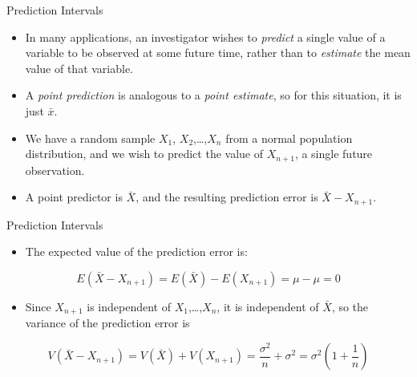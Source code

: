 \documentclass[
  ignorenonframetext,
]{beamer}
\providecommand{\tightlist}{%
  \setlength{\itemsep}{0pt}\setlength{\parskip}{0pt}}\usepackage{longtable,booktabs,array}
\begin{document}
\begin{frame}{Prediction Intervals}
\protect\hypertarget{prediction-intervals}{}
\begin{itemize}[<+->]
\tightlist
\item
  In many applications, an investigator wishes to \emph{predict} a
  single value of a variable to be observed at some future time, rather
  than to \emph{estimate} the mean value of that variable.
\item
  A \emph{point prediction} is analogous to a \emph{point estimate}, so
  for this situation, it is just \(\bar{x}\).
\item
  We have a random sample \(X_{1}\), \(X_{2}\),\ldots,\(X_{n}\) from a
  normal population distribution, and we wish to predict the value of
  \(X_{n+1}\), a single future observation.
\item
  A point predictor is \(\bar{X}\), and the resulting prediction error
  is \(\bar{X} - X_{n+1}\).
\end{itemize}
\end{frame}

\begin{frame}{Prediction Intervals}
\protect\hypertarget{prediction-intervals-1}{}
\begin{itemize}[<+->]
\tightlist
\item
  The expected value of the prediction error is:
\end{itemize}

\[
E(\bar{X} - X_{n+1}) = E(\bar{X}) - E(X_{n+1}) = \mu - \mu = 0
\]

\begin{itemize}[<+->]
\tightlist
\item
  Since \(X_{n+1}\) is independent of \(X_{1}\),\ldots,\(X_{n}\), it is
  independent of \(\bar{X}\), so the variance of the prediction error is
\end{itemize}

\[
V(\bar{X} - X_{n+1}) = V(\bar{X}) + V(X_{n+1}) = \frac{\sigma^{2}}{n} + \sigma^{2} = \sigma^{2}\left(1 + \frac{1}{n}\right)
\]
\end{frame}
\end{document}
